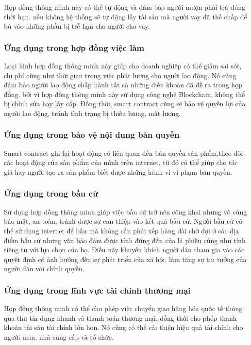 \documentclass[a4paper]{article}
\begin{document}
Hợp đồng thông minh này có thể tự động và đảm bảo người mượn phải trả đúng thời hạn, nếu không hệ thống sẽ tự động lấy tài sản mà người vay đã thế chấp để bù vào những phần bị trễ hạn cho người cho vay.

\subsubsection{Ứng dụng trong hợp đồng việc làm}
Loại hình hợp đồng thông minh này giúp cho doanh nghiệp có thể giảm sai sót, chi phí cũng như thời gian trong việc phát lương cho người lao động. Nó cũng đảm bảo người lao động chấp hành tất cả những điều khoản đã đề ra trong hợp đồng, bởi vì hợp đồng thông minh này sử dụng công nghệ Blockchain, không thể bị chỉnh sửa hay lấy cắp. Đồng thời, smart contract cũng sẽ bảo vệ quyền lợi của người lao động, tránh tình trạng bị thiếu lương, mất lương.

\subsubsection{Ứng dụng trong bảo vệ nội dung bản quyền}
Smart contract ghi lại hoạt động có liên quan đến bản quyền sản phẩm,theo dõi các hoạt động của sản phẩm của mình trên internet, từ đó có thể giúp cho tác giả hay người tạo ra sản phẩm biết được những hành vi vi phạm bản quyền.

\subsubsection{Ứng dụng trong bầu cử}
Sử dụng hợp đồng thông minh giúp việc bầu cử trở nên công khai nhưng vô cùng bảo mật, an toàn, tránh được sự can thiệp vào kết quả bầu cử. Người bầu cử có thể sử dụng internet để bầu mà không cần phải xếp hàng dài chờ đợi ở các địa điểm bầu cử nhưng vẫn bảo đảm được tính đúng đắn của lá phiếu cũng như tính riêng tư với lựa chọn của họ. Điều này khuyến khích người dân tham gia vào các quyết định có ảnh hưởng đến sự phát triển của xã hội, làm tăng sự tin tưởng của người dân với chính quyền.

\subsubsection{Ứng dụng trong lĩnh vực tài chính thương mại}
Hợp đồng thông minh có thể cho phép việc chuyển giao hàng hóa quốc tế thông qua thư tín dụng nhanh và thanh toán thương mại, đồng thời cho phép thanh khoản tài sản tài chính lớn hơn. Nó cũng có thể cải thiện hiệu quả tài chính cho người mua, nhà cung cấp và tổ chức.
\end{document}
